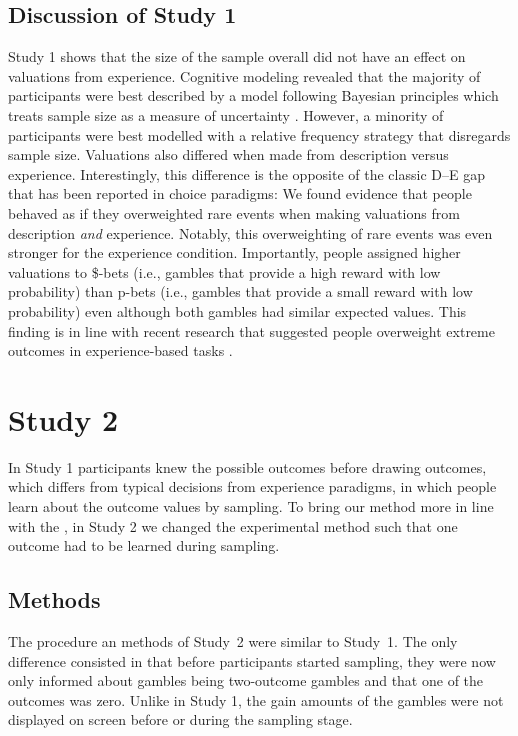 \documentclass[a4paper, man, natbib, floatsintext]{apa6}
\begin{document}
\subsection{Discussion of Study 1}

Study 1 shows that the size of the sample overall did not have an effect on valuations from experience. Cognitive modeling revealed that the majority of participants were best described by a model following Bayesian principles which treats sample size as a measure of uncertainty . However, a minority of participants were best modelled with a relative frequency strategy that disregards sample size. Valuations also differed when made from description versus experience. Interestingly, this difference is the opposite of the classic D--E gap that has been reported in choice paradigms: We found evidence that people behaved as if they overweighted rare events when making valuations from description \textit{and} experience. Notably, this overweighting of rare events was even stronger for the experience condition. Importantly, people assigned higher valuations to \$-bets (i.e., gambles that provide a high reward with low probability) than p-bets (i.e., gambles that provide a small reward with low probability) even although both gambles had similar expected values. This finding is in line with recent research that suggested people overweight extreme outcomes in experience-based tasks \citep{Ludvig2017} .

\section{Study 2}
In Study 1 participants knew the possible outcomes before drawing outcomes, which differs from typical decisions from experience paradigms, in which people learn about the outcome values by sampling. To bring our method more in line with the , in Study 2 we changed the experimental method such that one outcome had to be learned during sampling.

\subsection{Methods}
The procedure an methods of Study~2 were similar to Study~1. The only difference consisted in that before participants started sampling, they were now only informed about gambles being two-outcome gambles and that one of the outcomes was zero. Unlike in Study 1, the gain amounts of the gambles were not displayed on screen before or during the sampling stage.
\end{document}
